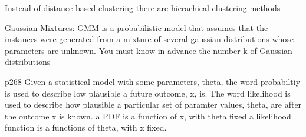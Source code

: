 Instead of distance based clustering
there are hierachical clustering methods


Gaussian Mixtures:
GMM is a probabilistic model that assumes that the instances were generated from a mixture of several gaussian distributions
whose parameters are unknown.
You must know in advance the number k of Gaussian distributions

p268
Given a statistical model with some parameters, theta, the word probabiltiy is used to describe low plausible a future outcome, x, is.
The word likelihood is used to describe how plausible a particular set of paramter values, theta, are after the outcome x is known.
a PDF is a function of x, with theta fixed
a likelihood function is a functions of theta, with x fixed.
















































































